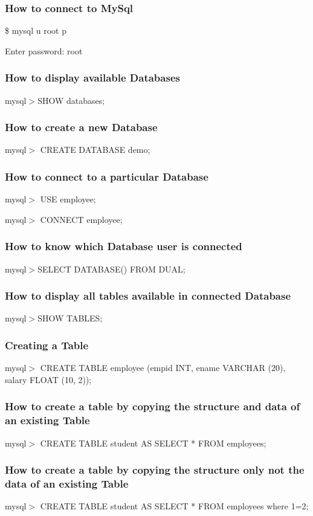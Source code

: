 \documentclass[11pt,a4paper]{article}
\begin{document}
\vspace{5in}

\subsubsection*{How to connect to MySql}
 \$  mysql u root p
      
    Enter password: root
\subsubsection*{How to display available Databases}
 mysql$>$SHOW databases;
\subsubsection*{How to create a new Database}
 mysql$>$ CREATE DATABASE demo;
\subsubsection*{How to connect to a particular Database}
mysql$>$ USE employee;\newline

mysql$>$ CONNECT employee;
\subsubsection*{How to know which Database user is connected}
 mysql$>$SELECT DATABASE() FROM DUAL;
\subsubsection*{How to display all tables available in connected Database}
 mysql$>$SHOW TABLES;
\subsubsection*{Creating a Table}
mysql$>$ CREATE TABLE employee (empid INT, ename VARCHAR (20), salary FLOAT (10, 2));
\subsubsection*{How to create a table by copying the structure and data of an existing Table}
mysql$>$ CREATE TABLE student AS SELECT * FROM employees;
\subsubsection*{How to create a table by copying the structure only not the data of an existing Table}
mysql$>$ CREATE TABLE student AS SELECT * FROM employees where 1=2;
\end{document}
